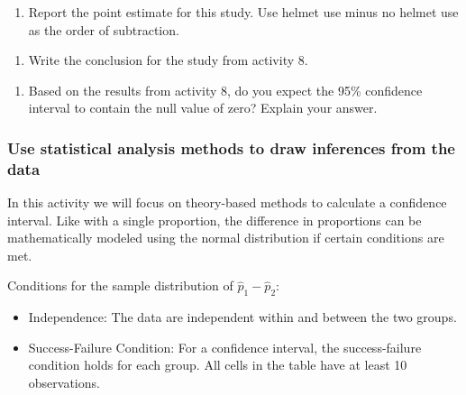 \documentclass[
]{report}
\providecommand{\tightlist}{%
  \setlength{\itemsep}{0pt}\setlength{\parskip}{0pt}}
\begin{document}
\begin{enumerate}
\def\labelenumi{\arabic{enumi}.}
\tightlist
\item
  Report the point estimate for this study. Use helmet use minus no helmet use as the order of subtraction.
\end{enumerate}

\vspace{0.4in}

\begin{enumerate}
\def\labelenumi{\arabic{enumi}.}
\setcounter{enumi}{1}
\tightlist
\item
  Write the conclusion for the study from activity 8.
\end{enumerate}

\vspace{1in}

\begin{enumerate}
\def\labelenumi{\arabic{enumi}.}
\setcounter{enumi}{2}
\tightlist
\item
  Based on the results from activity 8, do you expect the 95\% confidence interval to contain the null value of zero? Explain your answer.
\end{enumerate}

\vspace{1in}

\hypertarget{use-statistical-analysis-methods-to-draw-inferences-from-the-data-3}{%
\subsubsection*{Use statistical analysis methods to draw inferences from the data}\label{use-statistical-analysis-methods-to-draw-inferences-from-the-data-3}}

In this activity we will focus on theory-based methods to calculate a confidence interval. Like with a single proportion, the difference in proportions can be mathematically modeled using the normal distribution if certain conditions are met.

Conditions for the sample distribution of \(\hat{p}_1-\hat{p}_2\):

\begin{itemize}
\item
  Independence: The data are independent within and between the two groups.
\item
  Success-Failure Condition: For a confidence interval, the success-failure condition holds for each group. All cells in the table have at least 10 observations.
\end{itemize}
\end{document}
